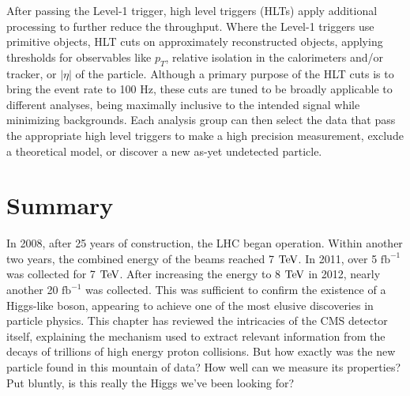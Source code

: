 After passing the Level-1 trigger, high level triggers (HLTs) apply additional processing to further reduce the throughput. Where the Level-1 triggers use primitive objects, HLT cuts on approximately reconstructed objects, applying thresholds for observables like $p_T$, relative isolation in the calorimeters and/or tracker, or $|\eta|$ of the particle. Although a primary purpose of the HLT cuts is to bring the event rate to 100 Hz, these cuts are tuned to be broadly applicable to different analyses, being maximally inclusive to the intended signal while minimizing backgrounds. Each analysis group can then select the data that pass the appropriate high level triggers to make a high precision measurement, exclude a theoretical model, or discover a new as-yet undetected particle.

\section{Summary}
\label{sec:expt_summary}

In 2008, after 25 years of construction, the LHC began operation. Within another two years, the combined energy of the beams reached 7 $\rm{TeV}$. In 2011, over 5 $\mathrm{fb}^{-1}$ was collected for 7 $\rm{TeV}$. After increasing the energy to 8 $\rm{TeV}$ in 2012, nearly another 20 $\mathrm{fb}^{-1}$ was collected. This was sufficient to confirm the existence of a Higgs-like boson, appearing to achieve one of the most elusive discoveries in particle physics. This chapter has reviewed the intricacies of the CMS detector itself, explaining the mechanism used to extract relevant information from the decays of trillions of high energy proton collisions. But how exactly was the new particle found in this mountain of data? How well can we measure its properties? Put bluntly, is this really the Higgs we've been looking for?